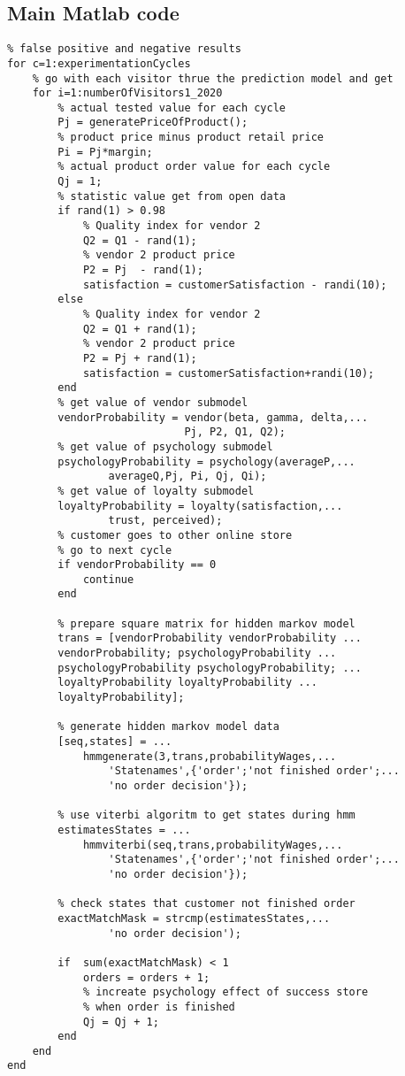 \subsection{Main Matlab code} \label{subsec:matlab}
\begin{lstlisting}[language=mcode]
% generate 10 times for get average values to prevent
% false positive and negative results
for c=1:experimentationCycles
    % go with each visitor thrue the prediction model and get
    for i=1:numberOfVisitors1_2020
        % actual tested value for each cycle
        Pj = generatePriceOfProduct();
        % product price minus product retail price
        Pi = Pj*margin;
        % actual product order value for each cycle
        Qj = 1;
        % statistic value get from open data
        if rand(1) > 0.98
            % Quality index for vendor 2
            Q2 = Q1 - rand(1);
            % vendor 2 product price
            P2 = Pj  - rand(1);
            satisfaction = customerSatisfaction - randi(10);
        else
            % Quality index for vendor 2
            Q2 = Q1 + rand(1);
            % vendor 2 product price
            P2 = Pj + rand(1);
            satisfaction = customerSatisfaction+randi(10);
        end
        % get value of vendor submodel
        vendorProbability = vendor(beta, gamma, delta,...
                            Pj, P2, Q1, Q2);
        % get value of psychology submodel
        psychologyProbability = psychology(averageP,...
                averageQ,Pj, Pi, Qj, Qi);
        % get value of loyalty submodel
        loyaltyProbability = loyalty(satisfaction,...
                trust, perceived);
        % customer goes to other online store
        % go to next cycle
        if vendorProbability == 0
            continue
        end

        % prepare square matrix for hidden markov model
        trans = [vendorProbability vendorProbability ...
        vendorProbability; psychologyProbability ...
        psychologyProbability psychologyProbability; ...
        loyaltyProbability loyaltyProbability ...
        loyaltyProbability];

        % generate hidden markov model data
        [seq,states] = ...
            hmmgenerate(3,trans,probabilityWages,...
                'Statenames',{'order';'not finished order';...
                'no order decision'});

        % use viterbi algoritm to get states during hmm
        estimatesStates = ...
            hmmviterbi(seq,trans,probabilityWages,...
                'Statenames',{'order';'not finished order';...
                'no order decision'});

        % check states that customer not finished order
        exactMatchMask = strcmp(estimatesStates,...
                'no order decision');

        if  sum(exactMatchMask) < 1
            orders = orders + 1;
            % increate psychology effect of success store
            % when order is finished
            Qj = Qj + 1;
        end
    end
end
\end{lstlisting}\\
